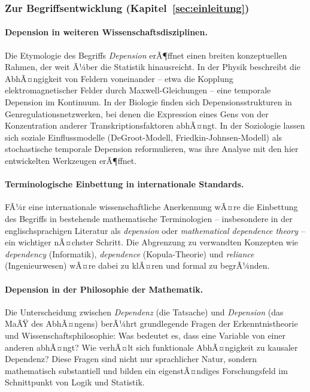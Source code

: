 ﻿\documentclass[12pt, a4paper]{article}
\theoremstyle{definition}
\theoremstyle{remark}
\begin{document}
\subsubsection{Zur Begriffsentwicklung (Kapitel~\ref{sec:einleitung})}

\paragraph{Depension in weiteren Wissenschaftsdisziplinen.}
Die Etymologie des Begriffs \emph{Depension} erÃ¶ffnet einen breiten konzeptuellen
Rahmen, der weit Ã¼ber die Statistik hinausreicht. In der Physik beschreibt die
AbhÃ¤ngigkeit von Feldern voneinander -- etwa die Kopplung elektromagnetischer Felder
durch Maxwell-Gleichungen -- eine temporale Depension im Kontinuum. In der Biologie
finden sich Depensionsstrukturen in Genregulationsnetzwerken, bei denen die Expression
eines Gens von der Konzentration anderer Transkriptionsfaktoren abhÃ¤ngt. In der
Soziologie lassen sich soziale Einflussmodelle (DeGroot-Modell, Friedkin-Johnsen-Modell)
als stochastische temporale Depension reformulieren, was ihre Analyse mit den hier
entwickelten Werkzeugen erÃ¶ffnet.

\paragraph{Terminologische Einbettung in internationale Standards.}
FÃ¼r eine internationale wissenschaftliche Anerkennung wÃ¤re die Einbettung des Begriffs
in bestehende mathematische Terminologien -- insbesondere in der englischsprachigen
Literatur als \emph{depension} oder \emph{mathematical dependence theory} -- ein
wichtiger nÃ¤chster Schritt. Die Abgrenzung zu verwandten Konzepten wie
\emph{dependency} (Informatik), \emph{dependence} (Kopula-Theorie) und
\emph{reliance} (Ingenieurwesen) wÃ¤re dabei zu klÃ¤ren und formal zu begrÃ¼nden.

\paragraph{Depension in der Philosophie der Mathematik.}
Die Unterscheidung zwischen \emph{Dependenz} (die Tatsache) und \emph{Depension}
(das MaÃŸ des AbhÃ¤ngens) berÃ¼hrt grundlegende Fragen der Erkenntnistheorie und
Wissenschaftsphilosophie: Was bedeutet es, dass eine Variable von einer anderen
abhÃ¤ngt? Wie verhÃ¤lt sich funktionale AbhÃ¤ngigkeit zu kausaler Dependenz? Diese
Fragen sind nicht nur sprachlicher Natur, sondern mathematisch substantiell und
bilden ein eigenstÃ¤ndiges Forschungsfeld im Schnittpunkt von Logik und Statistik.
\end{document}
